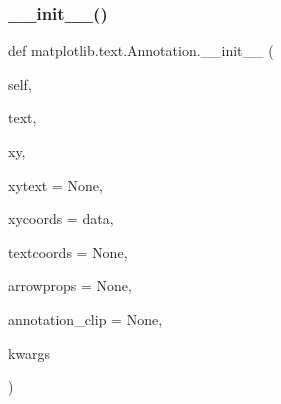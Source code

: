\subsubsection{\texorpdfstring{\+\_\+\+\_\+init\+\_\+\+\_\+()}{\_\_init\_\_()}}
{\footnotesize\ttfamily def matplotlib.\+text.\+Annotation.\+\_\+\+\_\+init\+\_\+\+\_\+ (\begin{DoxyParamCaption}\item[{}]{self,  }\item[{}]{text,  }\item[{}]{xy,  }\item[{}]{xytext = {\ttfamily None},  }\item[{}]{xycoords = {\ttfamily \textquotesingle{}data\textquotesingle{}},  }\item[{}]{textcoords = {\ttfamily None},  }\item[{}]{arrowprops = {\ttfamily None},  }\item[{}]{annotation\+\_\+clip = {\ttfamily None},  }\item[{}]{kwargs }\end{DoxyParamCaption})}

